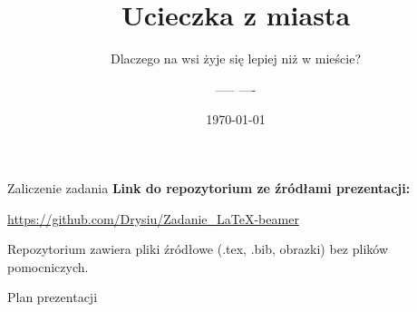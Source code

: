 \documentclass[aspectratio=169]{beamer} %
\title{Ucieczka z miasta}
\subtitle{Dlaczego na wsi żyje się lepiej niż w mieście?}
\author{----- ----}
\institute{Politechnika Wrocławska}
\date{\today}
\begin{document}
{
\begin{frame}
    \titlepage
\end{frame}
}

\begin{frame}{Zaliczenie zadania}
    \textbf{Link do repozytorium ze źródłami prezentacji:}
    
    \vspace{1cm}
    
    \begin{center}
        \url{https://github.com/Drysiu/Zadanie_LaTeX-beamer}
    \end{center}
    
    \vspace{1cm}
    \footnotesize
    Repozytorium zawiera pliki źródłowe (.tex, .bib, obrazki) bez plików pomocniczych.
\end{frame}

\begin{frame}{Plan prezentacji}
    \tableofcontents
\end{frame}

    
    
    
    
    
    
    
    
\end{document}
